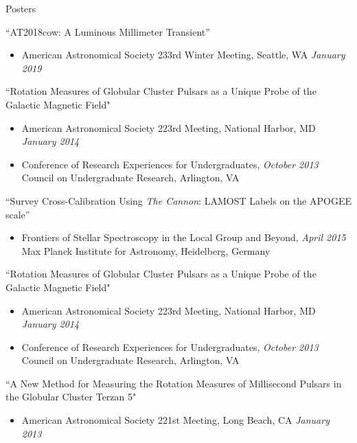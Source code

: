 \documentclass{resume} %
\begin{document}

\begin{rSection}{Posters}

``AT2018cow: A Luminous Millimeter Transient''
\begin{itemize}
  \item
    American Astronomical Society 233rd Winter Meeting, Seattle, WA
    \hfill {\em January 2019}\\
\end{itemize}

``Rotation Measures of Globular Cluster Pulsars as a Unique Probe of the Galactic Magnetic Field"
\begin{itemize}
\item
American Astronomical Society 223rd Meeting, 
National Harbor, MD \hfill {\em January 2014}
\item
Conference of Research Experiences for Undergraduates, \hfill {\em October 2013}\\
Council on Undergraduate Research, Arlington, VA 
\end{itemize}

``Survey Cross-Calibration Using \emph{The Cannon}:
LAMOST Labels on the APOGEE scale''
\begin{itemize}
  \item
    Frontiers of Stellar Spectroscopy in the Local Group and Beyond,
    \hfill {\em April 2015}\\
    Max Planck Institute for Astronomy, Heidelberg, Germany 

\end{itemize}

``Rotation Measures of Globular Cluster Pulsars as a Unique Probe of the Galactic Magnetic Field"
\begin{itemize}
\item
American Astronomical Society 223rd Meeting, 
National Harbor, MD \hfill {\em January 2014}
\item
Conference of Research Experiences for Undergraduates, \hfill {\em October 2013}\\
Council on Undergraduate Research, Arlington, VA 
\end{itemize}

``A New Method for Measuring the Rotation Measures of Millisecond Pulsars in the Globular Cluster Terzan 5" 
\begin{itemize}
\item
American Astronomical Society 221st Meeting, 
Long Beach, CA \hfill {\em January 2013}
\end{itemize}

\end{rSection}
\end{document}
